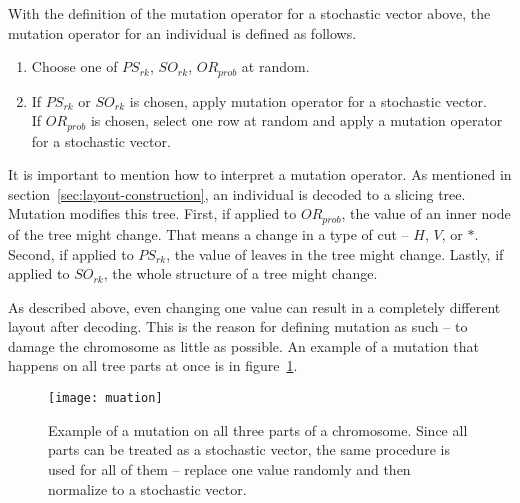 With the definition of the mutation operator for a stochastic vector above, the mutation operator for an individual is defined as follows.

\begin{enumerate}
    \item Choose one of $PS_{rk}$, $SO_{rk}$, $OR_{prob}$ at random.
    \item If $PS_{rk}$ or $SO_{rk}$ is chosen, apply mutation operator for a stochastic vector.\\
    If $OR_{prob}$ is chosen, select one row at random and apply a mutation operator for a stochastic vector.
\end{enumerate}

It is important to mention how to interpret a mutation operator.
As mentioned in section~\ref{sec:layout-construction}, an individual is decoded to a slicing tree.
Mutation modifies this tree.
First, if applied to $OR_{prob}$, the value of an inner node of the tree might change.
That means a change in a type of cut – $H$, $V$, or $*$.
Second, if applied to $PS_{rk}$, the value of leaves in the tree might change.
Lastly, if applied to $SO_{rk}$, the whole structure of a tree might change.

As described above, even changing one value can result in a completely different layout after decoding.
This is the reason for defining mutation as such – to damage the chromosome as little as possible.
An example of a mutation that happens on all tree parts at once is in figure~\ref{fig:mutation}.


\begin{figure}[!htp]
    \texttt{[image: muation]}\caption{
        Example of a mutation on all three parts of a chromosome.
        Since all parts can be treated as a stochastic vector, the same procedure
        is used for all of them – replace one value randomly and then normalize to a stochastic vector.
    }
    \label{fig:mutation}
\end{figure}

